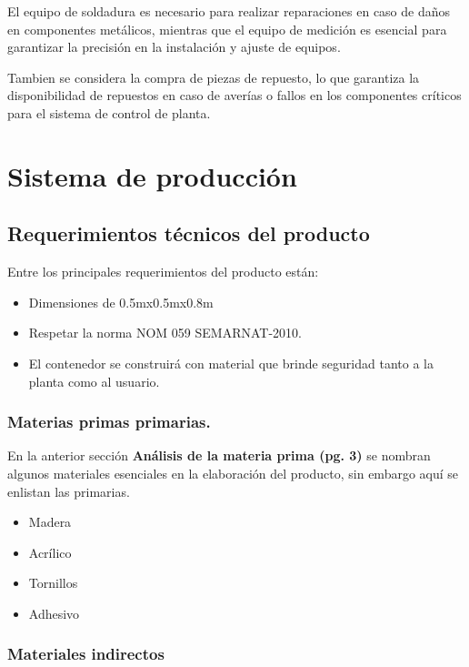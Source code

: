 El equipo de soldadura es necesario para realizar reparaciones en caso de daños en componentes metálicos, mientras que el equipo de medición es esencial para garantizar la precisión en la instalación y ajuste de equipos.

Tambien se considera la compra de piezas de repuesto, lo que garantiza la disponibilidad de repuestos en caso de averías o fallos en los componentes críticos para el sistema de control de planta.




\section{Sistema de producción}
\subsection{Requerimientos técnicos del producto}

Entre los principales requerimientos del producto están:

\begin{itemize}
    \item Dimensiones de 0.5mx0.5mx0.8m
    \item Respetar la norma NOM 059 SEMARNAT-2010.
    \item El contenedor se construirá con material que brinde seguridad tanto a la planta como al usuario.
\end{itemize}

\subsubsection{Materias primas primarias.}

En la anterior sección \textbf{Análisis de la materia prima (pg. 3)} se nombran algunos materiales esenciales en la elaboración del producto, sin embargo aquí se enlistan las primarias.

\begin{itemize}
    \item Madera
    \item Acrílico
    \item Tornillos
    \item Adhesivo
\end{itemize}

\subsubsection{Materiales indirectos}

